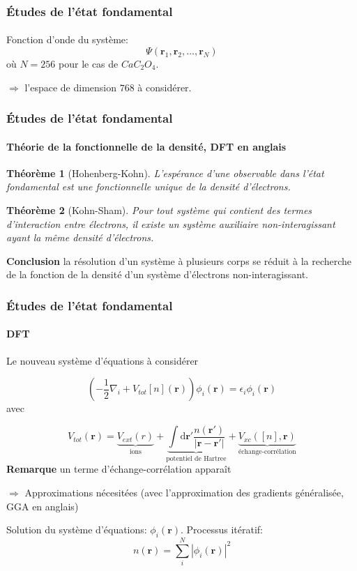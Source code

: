 \documentclass[french]{beamer}
\newcommand{\vb}[1]{\mathbf{#1}}
\newcommand{\dd}[0]{\textrm{d}}
\newtheorem{theoreme}{Théorème}
\begin{document}
\begin{frame}
\frametitle{Études de l'état fondamental}
\framesubtitle{}
Fonction d'onde du système:
\begin{equation*}
  \Psi(\vb{r}_1, \vb{r}_2, \ldots, \vb{r}_N)
\end{equation*}
où $N=256$ pour le cas de $CaC_2O_4$.

$\Rightarrow $ l'espace de dimension $768$ à considérer.

\end{frame}
\newpage
\begin{frame}
\frametitle{Études de l'état fondamental}
\framesubtitle{Théorie de la fonctionnelle de la densité, DFT en anglais}
\begin{theoreme}[Hohenberg-Kohn]
  L'espérance d'une observable dans l'état fondamental est une fonctionnelle unique
  de la densité d'électrons.
\end{theoreme}

\begin{theoreme}[Kohn-Sham]
  Pour tout système qui contient des termes d'interaction entre électrons,
  il existe un système auxiliaire non-interagissant ayant la même densité d'électrons.
\end{theoreme}

\textbf{Conclusion} la résolution d'un système à plusieurs corps se réduit à la recherche de la fonction de la densité d'un système d'électrons non-interagissant.
\end{frame}
\newpage
\begin{frame}
\frametitle{Études de l'état fondamental}
\framesubtitle{DFT}
Le nouveau système d'équations à considérer

\begin{equation*}
  (-\frac{1}{2}\nabla_i + V_{tot}[n](\textbf{r}))\phi_i(\textbf{r}) = \epsilon_i\phi_i(\textbf{r})
\end{equation*}
avec

\begin{equation*}
  V_{tot}(\textbf{r}) = \underbrace{V_{ext}(r)}_\text{ions}
  + \underbrace{\int \dd \textbf{r}' \frac{n(\textbf{r}')}{|\textbf{r} - \textbf{r}'|}}_\text{potentiel de Hartree}
  + \underbrace{V_{xc}([n], \textbf{r})}_\text{échange-corrélation}
\end{equation*}
\textbf{Remarque} un terme d'échange-corrélation apparaît

$\Rightarrow$ Approximations nécesitées (avec l'approximation des gradients généralisée, GGA en anglais)

Solution du système d'équations: $\phi_i(\vb{r})$. Processus itératif:
\begin{equation*}
  n(\vb{r}) = \sum_i^N |\phi_i(\vb{r})|^2
\end{equation*}
\end{frame}
\end{document}
